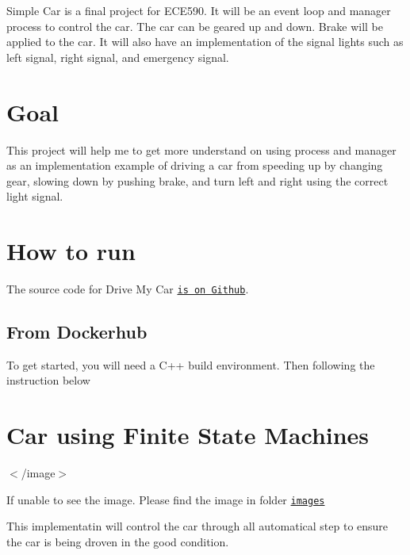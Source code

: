 Simple Car is a final project for E\+C\+E590. It will be an event loop and manager process to control the car. The car can be geared up and down. Brake will be applied to the car. It will also have an implementation of the signal lights such as left signal, right signal, and emergency signal.

\section*{Goal }

This project will help me to get more understand on using process and manager as an implementation example of driving a car from speeding up by changing gear, slowing down by pushing brake, and turn left and right using the correct light signal.

\section*{How to run }

The source code for Drive My Car \href{https://github.com/hoaibaonguyen/project_drivingmycar590.git}{\tt is on Github}.

\subsection*{From Dockerhub }

To get started, you will need a C++ build environment. Then following the instruction below 


\section*{Car using Finite State Machines }

$<$/image$>$

If unable to see the image. Please find the image in folder \href{https://github.com/hoaibaonguyen/project_drivingmycar590/blob/master/images/carfinitemachine.PNG}{\tt images}

This implementatin will control the car through all automatical step to ensure the car is being droven in the good condition.

